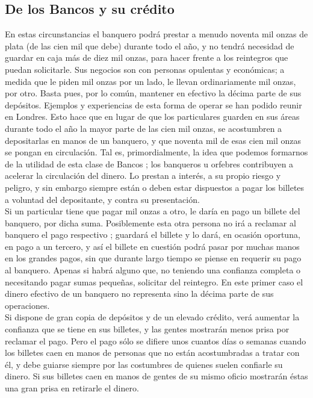 \documentclass[10pt]{article}
\begin{document}
\begin{multicols}{1}
\section*{De los Bancos y su crédito}
En estas circunstancias el banquero podrá prestar a menudo noventa mil onzas de plata (de las cien mil que debe) durante todo el año, y no tendrá necesidad de guardar en caja más de diez mil onzas, para hacer frente a los reintegros que puedan solicitarle. Sus negocios son con personas opulentas y económicas; a medida que le piden mil onzas por un lado, le llevan ordinariamente mil onzas, por otro. Basta pues, por lo común, mantener en efectivo la décima parte de sus depósitos. Ejemplos y experiencias de esta forma de operar se han podido reunir en Londres. Esto hace que en lugar de que los particulares guarden en sus áreas durante todo el año la mayor parte de las cien mil onzas, se acostumbren a depositarlas en manos de un banquero, y que noventa mil de esas cien mil onzas se pongan en circulación. Tal es, primordialmente, la idea que podemos formarnos de la utilidad de esta clase de Bancos ; los banqueros u orfebres contribuyen a acelerar la circulación del dinero. Lo prestan a interés, a su propio riesgo y peligro, y sin embargo siempre están o deben estar dispuestos a pagar los billetes a voluntad del depositante, y contra su presentación.\\
Si un particular tiene que pagar mil onzas a otro, le daría en pago un billete del banquero, por dicha suma. Posiblemente esta otra persona no irá a reclamar al banquero el pago respectivo ; guardará el billete y lo dará, en ocasión oportuna, en pago a un tercero, y así el billete en cuestión podrá pasar por muchas manos en los grandes pagos, sin que durante largo tiempo se piense en requerir su pago al banquero. Apenas si habrá alguno que, no teniendo una confianza completa o necesitando pagar sumas pequeñas, solicitar del reintegro. En este primer caso el dinero efectivo de un banquero no representa sino la décima parte de sus operaciones.\\
Si dispone de gran copia de depósitos y de un elevado crédito, verá aumentar la confianza que se tiene en sus billetes, y las gentes mostrarán menos prisa por reclamar el pago. Pero el pago sólo se difiere unos cuantos días o semanas cuando los billetes caen en manos de personas que no están acostumbradas a tratar con él, y debe guiarse siempre por las costumbres de quienes suelen confiarle su dinero. Si sus billetes caen en manos de gentes de su mismo oficio mostrarán éstas una gran prisa en retirarle el dinero.

\end{multicols}
\end{document}
